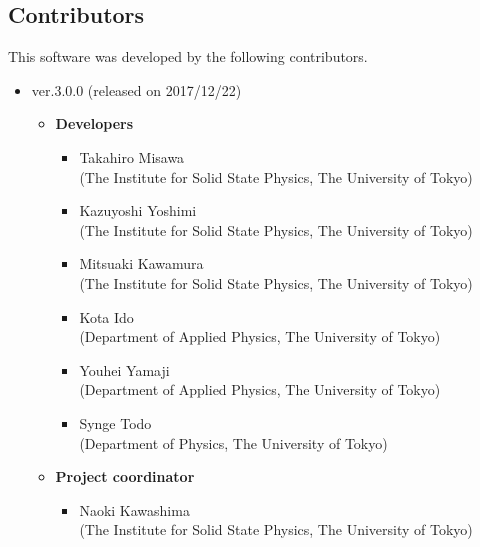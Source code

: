 \subsection{Contributors}
\label{subsec:contributors}
This software was developed by the following contributors.
\begin{itemize}
\item{ver.3.0.0 (released on 2017/12/22)}
\begin{itemize}
	\item{\bf Developers}
	\begin{itemize}
	\item{Takahiro Misawa \\(The Institute for Solid State Physics, The University of Tokyo)}
	\item{Kazuyoshi Yoshimi\\ (The Institute for Solid State Physics, The University of Tokyo)}
	\item{Mitsuaki Kawamura\\ (The Institute for Solid State Physics, The University of Tokyo)}
	\item{Kota Ido\\ (Department of Applied Physics, The University of Tokyo)}
	\item{Youhei Yamaji\\ (Department of Applied Physics, The University of Tokyo)}
	\item{Synge Todo\\ (Department of Physics, The University of Tokyo)}
	\end{itemize}
	\item{\bf Project coordinator}
	\begin{itemize}
	\item{Naoki Kawashima\\ (The Institute for Solid State Physics, The University of Tokyo)}
	\end{itemize}
\end{itemize}


\end{itemize}
